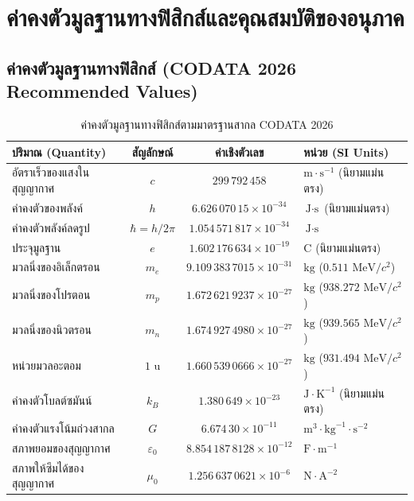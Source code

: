 \chapter{ค่าคงตัวมูลฐานทางฟิสิกส์และคุณสมบัติของอนุภาค}
\label{chap:appendix_constants}

\section{ค่าคงตัวมูลฐานทางฟิสิกส์ (CODATA 2026 Recommended Values)}

\begin{table}[H]
\centering
\caption{ค่าคงตัวมูลฐานทางฟิสิกส์ตามมาตรฐานสากล CODATA 2026}
\label{tab:codata_constants}
\small
\begin{tabularx}{\textwidth}{>{\raggedright\arraybackslash}p{4.2cm} c c >{\raggedright\arraybackslash}X}
\toprule
\textbf{ปริมาณ (Quantity)} & \textbf{สัญลักษณ์} & \textbf{ค่าเชิงตัวเลข} & \textbf{หน่วย (SI Units)} \\
\midrule
อัตราเร็วของแสงในสุญญากาศ & $c$ & $299\,792\,458$ & $\text{m}\cdot\text{s}^{-1}$ (นิยามแม่นตรง) \\
ค่าคงตัวของพลังค์ & $h$ & $6.626\,070\,15 \times 10^{-34}$ & $\text{J}\cdot\text{s}$ (นิยามแม่นตรง) \\
ค่าคงตัวพลังค์ลดรูป & $\hbar = h/2\pi$ & $1.054\,571\,817 \times 10^{-34}$ & $\text{J}\cdot\text{s}$ \\
ประจุมูลฐาน & $e$ & $1.602\,176\,634 \times 10^{-19}$ & $\text{C}$ (นิยามแม่นตรง) \\
มวลนิ่งของอิเล็กตรอน & $m_e$ & $9.109\,383\,7015 \times 10^{-31}$ & $\text{kg}$ ($0.511\text{ MeV}/c^2$) \\
มวลนิ่งของโปรตอน & $m_p$ & $1.672\,621\,9237 \times 10^{-27}$ & $\text{kg}$ ($938.272\text{ MeV}/c^2$) \\
มวลนิ่งของนิวตรอน & $m_n$ & $1.674\,927\,4980 \times 10^{-27}$ & $\text{kg}$ ($939.565\text{ MeV}/c^2$) \\
หน่วยมวลอะตอม & $1\text{ u}$ & $1.660\,539\,0666 \times 10^{-27}$ & $\text{kg}$ ($931.494\text{ MeV}/c^2$) \\
ค่าคงตัวโบลต์ซมันน์ & $k_B$ & $1.380\,649 \times 10^{-23}$ & $\text{J}\cdot\text{K}^{-1}$ (นิยามแม่นตรง) \\
ค่าคงตัวแรงโน้มถ่วงสากล & $G$ & $6.674\,30 \times 10^{-11}$ & $\text{m}^3\cdot\text{kg}^{-1}\cdot\text{s}^{-2}$ \\
สภาพยอมของสุญญากาศ & $\varepsilon_0$ & $8.854\,187\,8128 \times 10^{-12}$ & $\text{F}\cdot\text{m}^{-1}$ \\
สภาพให้ซึมได้ของสุญญากาศ & $\mu_0$ & $1.256\,637\,0621 \times 10^{-6}$ & $\text{N}\cdot\text{A}^{-2}$ \\
\bottomrule
\end{tabularx}
\end{table}

